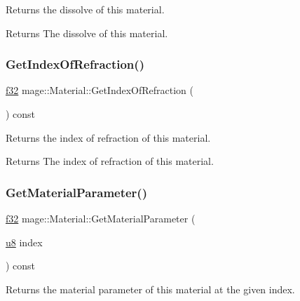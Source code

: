 Returns the dissolve of this material.

\begin{DoxyReturn}{Returns}
The dissolve of this material. 
\end{DoxyReturn}
\hypertarget{structmage_1_1_material_aebcb799be41d9c8b7fdaa4bd85bdba0b}{}\label{structmage_1_1_material_aebcb799be41d9c8b7fdaa4bd85bdba0b} 
\subsubsection{\texorpdfstring{Get\+Index\+Of\+Refraction()}{GetIndexOfRefraction()}}
{\footnotesize\ttfamily \hyperlink{namespacemage_a6a44ad388483959dc4dff9f2aef91431}{f32} mage\+::\+Material\+::\+Get\+Index\+Of\+Refraction (\begin{DoxyParamCaption}{ }\end{DoxyParamCaption}) const\hspace{0.3cm}{\ttfamily [noexcept]}}

Returns the index of refraction of this material.

\begin{DoxyReturn}{Returns}
The index of refraction of this material. 
\end{DoxyReturn}
\hypertarget{structmage_1_1_material_a61798773153ef1d4eab7d9a75d36c050}{}\label{structmage_1_1_material_a61798773153ef1d4eab7d9a75d36c050} 
\subsubsection{\texorpdfstring{Get\+Material\+Parameter()}{GetMaterialParameter()}}
{\footnotesize\ttfamily \hyperlink{namespacemage_a6a44ad388483959dc4dff9f2aef91431}{f32} mage\+::\+Material\+::\+Get\+Material\+Parameter (\begin{DoxyParamCaption}\item[{\hyperlink{namespacemage_a5a362e2d56fc439362a80516ecae7828}{u8}}]{index }\end{DoxyParamCaption}) const\hspace{0.3cm}{\ttfamily [noexcept]}}

Returns the material parameter of this material at the given index.

